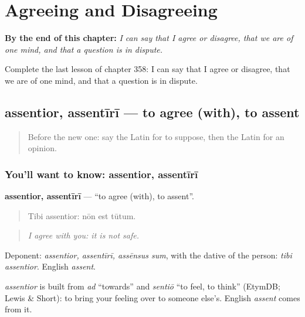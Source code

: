 
\chapter{Agreeing and Disagreeing}
\label{ch:la-agreeing-and-disagreeing}

\begin{chapteropening}
\textbf{By the end of this chapter:} \emph{I can say that I agree or disagree, that we are of one mind, and that a question is in dispute.}

Complete the last lesson of chapter 358: I can say that I agree or disagree, that we are of one mind, and that a question is in dispute.
\end{chapteropening}

\section[assentior, assentīrī]{assentior, assentīrī — to agree (with), to assent}

\label{lesson:LA-C358-assentior}



\begin{quote}
Before the new one: say the Latin for to suppose, then the Latin for an opinion.
\end{quote}

\subsection*{You'll want to know: assentior, assentīrī}
\textbf{assentior, assentīrī} — \textquotedblleft{}to agree (with), to assent\textquotedblright{}.

\begin{quote}
Tibi assentior: nōn est tūtum.
\end{quote}

\begin{quote}
\emph{I agree with you: it is not safe.}
\end{quote}

Deponent: \emph{assentior, assentīrī, assēnsus sum}, with the dative of the person: \emph{tibi assentior}. English \emph{assent}.

\begin{cousinweb}
\emph{assentior} is built from \emph{ad} \textquotedblleft{}towards\textquotedblright{} and \emph{sentiō} \textquotedblleft{}to feel, to think\textquotedblright{} (EtymDB; Lewis \& Short): to bring your feeling over to someone else's. English \emph{assent} comes from it.
\end{cousinweb}


